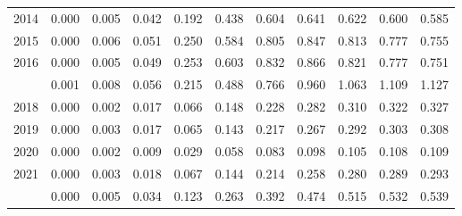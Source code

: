 \documentclass[
]{article}
\begin{document}
\begin{longtable}[t]{lrrrrrrrrrr}
2014 & 0.000 & 0.005 & 0.042 & 0.192 & 0.438 & 0.604 & 0.641 & 0.622 & 0.600 & 0.585\\
2015 & 0.000 & 0.006 & 0.051 & 0.250 & 0.584 & 0.805 & 0.847 & 0.813 & 0.777 & 0.755\\
2016 & 0.000 & 0.005 & 0.049 & 0.253 & 0.603 & 0.832 & 0.866 & 0.821 & 0.777 & 0.751\\
\addlinespace
2017 & 0.001 & 0.008 & 0.056 & 0.215 & 0.488 & 0.766 & 0.960 & 1.063 & 1.109 & 1.127\\
2018 & 0.000 & 0.002 & 0.017 & 0.066 & 0.148 & 0.228 & 0.282 & 0.310 & 0.322 & 0.327\\
2019 & 0.000 & 0.003 & 0.017 & 0.065 & 0.143 & 0.217 & 0.267 & 0.292 & 0.303 & 0.308\\
2020 & 0.000 & 0.002 & 0.009 & 0.029 & 0.058 & 0.083 & 0.098 & 0.105 & 0.108 & 0.109\\
2021 & 0.000 & 0.003 & 0.018 & 0.067 & 0.144 & 0.214 & 0.258 & 0.280 & 0.289 & 0.293\\
\addlinespace
2022 & 0.000 & 0.005 & 0.034 & 0.123 & 0.263 & 0.392 & 0.474 & 0.515 & 0.532 & 0.539\\*
\end{longtable}
\end{document}
